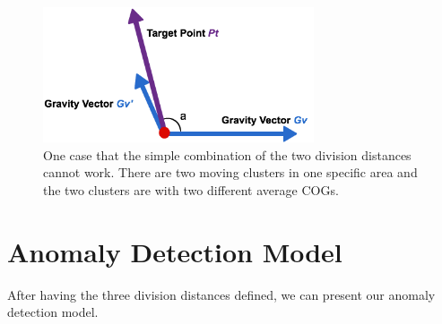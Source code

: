 \documentclass[12pt,glossary]{dalcsthesis}
\begin{document}
\begin{figure}[!htb]
\centering
\includegraphics[width=8cm]{cosine.png}
\caption{One case that the simple combination of the two division distances cannot work. There are two moving clusters in one specific area and the two clusters are with two different average COGs. }
\label{fig:abnormal_cosine}
\end{figure}

\section{Anomaly Detection Model}
\label{sec:anomaly_detection_model}

After having the three division distances defined, we can present our anomaly detection model. %
\end{document}
